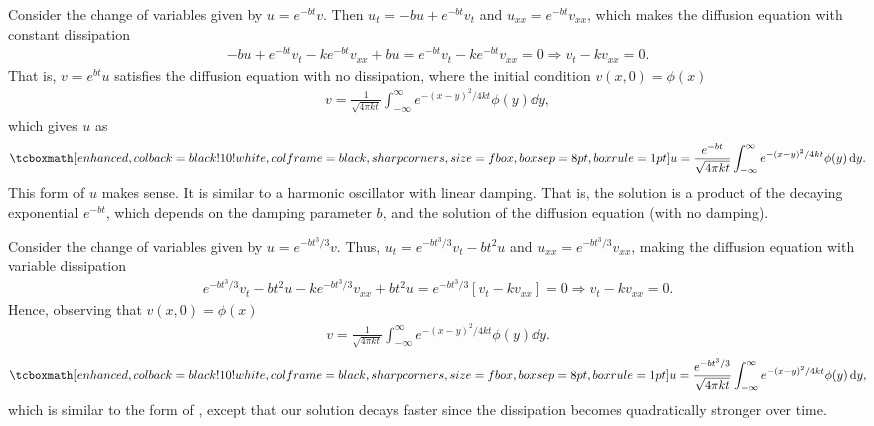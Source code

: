 \def\duedate{09/29/22}
\def\HWnum{4}



    

Consider the change of variables given by $u = e^{-bt}v$.
Then $u_{t} = -bu + e^{-bt}v_{t}$ and $u_{xx} = e^{-bt}v_{xx}$, which makes the diffusion equation with constant dissipation
\begin{eqnarray}
    \label{eq:heat-with-diss}
    -bu + e^{-bt}v_{t} - ke^{-bt}v_{xx} + bu = e^{-bt}v_{t} - ke^{-bt}v_{xx} = 0 \Rightarrow v_{t} - kv_{xx} = 0
.\end{eqnarray}
That is, $v = e^{bt}u$ satisfies the diffusion equation with no dissipation, where the initial condition $v(x,0) = \phi(x)$
\begin{eqnarray}
    \label{eq:v-constant-diss}
    v = \frac{1}{\sqrt{4 \pi k t}}\int_{-\infty}^{\infty} e^{-(x-y)^2/4kt}\phi(y) \dd{y}
,\end{eqnarray}
which gives $u$ as
\begin{eqnarray}
    \label{eq:u-from-v}
    \eqbox{
    u = \frac{e^{-bt}}{\sqrt{4 \pi k t}}\int_{-\infty}^{\infty} e^{-(x-y)^2/4kt} \phi(y) \dd{y}
}
.\end{eqnarray}
This form of $u$ makes sense.
It is similar to a harmonic oscillator with linear damping.
That is, the solution is a product of the decaying exponential $e^{-bt}$, which depends on the damping parameter $b$, and the solution of the diffusion equation (with no damping). 


Consider the change of variables given by $u = e^{-bt^3/3}v$.
Thus, $u_{t} = e^{-bt^3/3}v_{t} - bt^2u$ and $u_{xx} = e^{-bt^3/3}v_{xx}$, making the diffusion equation with variable dissipation
\begin{eqnarray}
    \label{eq:heat-with-var-diss}
    e^{-bt^3/3}v_{t} - bt^2u - ke^{-bt^3/3}v_{xx} + bt^2u = e^{-bt^3/3}[v_{t} - kv_{xx}] = 0 \Rightarrow v_{t} - kv_{xx} = 0
.\end{eqnarray}
Hence, observing that $v(x,0) = \phi(x)$
\begin{eqnarray}
    \label{eq:v-var-diss}
    v = \frac{1}{\sqrt{4 \pi k t}} \int_{-\infty}^{\infty} e^{-(x-y)^2/4kt}\phi(y) \dd{y}
.\end{eqnarray}
\begin{eqnarray}
    \label{eq:u-var-diss}
    \eqbox{
    u = \frac{e^{-bt^3/3}}{\sqrt{4 \pi k t}} \int_{-\infty}^{\infty} e^{-(x-y)^2/4kt} \phi(y) \dd{y}
}
,\end{eqnarray}
which is similar to the form of , except that our solution decays faster since the dissipation becomes quadratically stronger over time.


